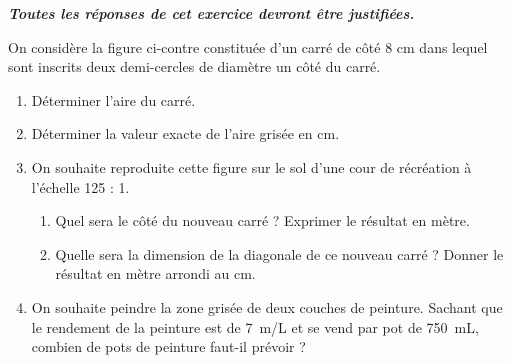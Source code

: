 \textbf{\textit{Toutes les réponses de cet exercice devront être justifiées.}}

\bigskip
\begin{minipage}[t]{.5\linewidth}
	On considère la figure ci-contre constituée d’un carré de côté 8 cm dans lequel sont inscrits deux demi-cercles de diamètre un côté du carré.
\end{minipage}
\begin{minipage}{.5\linewidth}
	\centering
\end{minipage}

\begin{enumerate}
	\item Déterminer l'aire du carré.
	\item Déterminer la valeur exacte de l'aire grisée en cm.
	\item On souhaite reproduite cette figure sur le sol d'une cour de récréation à l'échelle 125 : 1.
	\begin{enumerate}
		\item Quel sera le côté du nouveau carré ? Exprimer le résultat en mètre.
		\item Quelle sera la dimension de la diagonale de ce nouveau carré ? Donner le résultat en mètre arrondi au cm. 
	\end{enumerate}
	
	\item On souhaite peindre la zone grisée de deux couches de peinture. Sachant que le rendement de la peinture est de 7~m/L et se vend par pot de 750~mL, combien de pots de peinture faut-il prévoir ?

\end{enumerate}